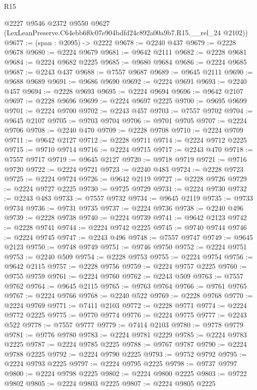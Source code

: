 \begin{lexlean}{R15}
\begin{coremodule}
      @2227
      @9546
      @2372
      @9550
      @9627
      (LexLeanPreserve.C64ebb6f0c07e904bdfd24c892a00a9b7.R15.__rel_24 @2102))
@9677 := (span : @2095) -> @2222
@9678 := @2240 @437
@9679 := @2228 @9678
@9680 := @2224 @9679
@9681 := @9642 @2111
@9682 := @2228 @9681
@9684 := @2224 @9682 @2225
@9685 := @9680 @9684
@9686 := @2224 @9685
@9687 := @2243 @437
@9688 := @7557 @9687
@9689 := @9645 @2111
@9690 := @9688 @9689
@9691 := @9686 @9690
@9692 := @2224 @9691
@9693 := @2240 @457
@9694 := @2228 @9693
@9695 := @2224 @9694
@9696 := @9642 @2107
@9697 := @2228 @9696
@9699 := @2224 @9697 @2225
@9700 := @9695 @9699
@9701 := @2224 @9700
@9702 := @2243 @457
@9703 := @7557 @9702
@9704 := @9645 @2107
@9705 := @9703 @9704
@9706 := @9701 @9705
@9707 := @2224 @9706
@9708 := @2240 @470
@9709 := @2228 @9708
@9710 := @2224 @9709
@9711 := @9642 @2127
@9712 := @2228 @9711
@9714 := @2224 @9712 @2225
@9715 := @9710 @9714
@9716 := @2224 @9715
@9717 := @2243 @470
@9718 := @7557 @9717
@9719 := @9645 @2127
@9720 := @9718 @9719
@9721 := @9716 @9720
@9722 := @2224 @9721
@9723 := @2240 @483
@9724 := @2228 @9723
@9725 := @2224 @9724
@9726 := @9642 @2119
@9727 := @2228 @9726
@9729 := @2224 @9727 @2225
@9730 := @9725 @9729
@9731 := @2224 @9730
@9732 := @2243 @483
@9733 := @7557 @9732
@9734 := @9645 @2119
@9735 := @9733 @9734
@9736 := @9731 @9735
@9737 := @2224 @9736
@9738 := @2240 @496
@9739 := @2228 @9738
@9740 := @2224 @9739
@9741 := @9642 @2123
@9742 := @2228 @9741
@9744 := @2224 @9742 @2225
@9745 := @9740 @9744
@9746 := @2224 @9745
@9747 := @2243 @496
@9748 := @7557 @9747
@9749 := @9645 @2123
@9750 := @9748 @9749
@9751 := @9746 @9750
@9752 := @2224 @9751
@9753 := @2240 @509
@9754 := @2228 @9753
@9755 := @2224 @9754
@9756 := @9642 @2115
@9757 := @2228 @9756
@9759 := @2224 @9757 @2225
@9760 := @9755 @9759
@9761 := @2224 @9760
@9762 := @2243 @509
@9763 := @7557 @9762
@9764 := @9645 @2115
@9765 := @9763 @9764
@9766 := @9761 @9765
@9767 := @2224 @9766
@9768 := @2240 @522
@9769 := @2228 @9768
@9770 := @2224 @9769
@9771 := @7411 @2103
@9772 := @2228 @9771
@9774 := @2224 @9772 @2225
@9775 := @9770 @9774
@9776 := @2224 @9775
@9777 := @2243 @522
@9778 := @7557 @9777
@9779 := @7414 @2103
@9780 := @9778 @9779
@9781 := @9776 @9780
@9783 := @2224 @9781 @2229
@9785 := @2224 @9783 @2225
@9787 := @2224 @9785 @2225
@9788 := @9767 @9787
@9790 := @2224 @9788 @2225
@9792 := @2224 @9790 @2225
@9793 := @9752 @9792
@9795 := @2224 @9793 @2225
@9797 := @2224 @9795 @2225
@9798 := @9737 @9797
@9800 := @2224 @9798 @2225
@9802 := @2224 @9800 @2225
@9803 := @9722 @9802
@9805 := @2224 @9803 @2225
@9807 := @2224 @9805 @2225

\end{coremodule}
\end{lexlean}
